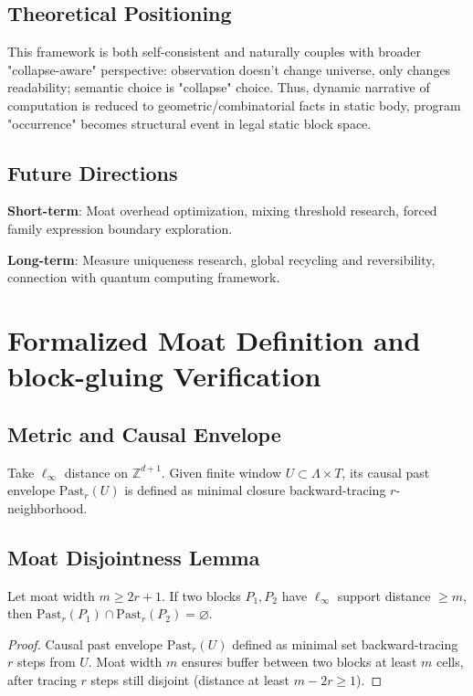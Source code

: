 \documentclass[12pt]{article}
\theoremstyle{plain}
\theoremstyle{definition}
\begin{document}
\subsection{Theoretical Positioning}

This framework is both self-consistent and naturally couples with broader "collapse-aware" perspective: observation doesn't change universe, only changes readability; semantic choice is "collapse" choice. Thus, dynamic narrative of computation is reduced to geometric/combinatorial facts in static body, program "occurrence" becomes structural event in legal static block space.

\subsection{Future Directions}

\textbf{Short-term}: Moat overhead optimization, mixing threshold research, forced family expression boundary exploration.

\textbf{Long-term}: Measure uniqueness research, global recycling and reversibility, connection with quantum computing framework.

\appendix

\section{Formalized Moat Definition and block-gluing Verification}

\subsection{Metric and Causal Envelope}

Take $\ell_\infty$ distance on $\mathbb{Z}^{d+1}$. Given finite window $U \subset \Lambda \times T$, its causal past envelope $\mathrm{Past}_r(U)$ is defined as minimal closure backward-tracing $r$-neighborhood.

\subsection{Moat Disjointness Lemma}

Let moat width $m \ge 2r + 1$. If two blocks $P_1, P_2$ have $\ell_\infty$ support distance $\ge m$, then $\mathrm{Past}_r(P_1) \cap \mathrm{Past}_r(P_2) = \varnothing$.

\begin{proof}
Causal past envelope $\mathrm{Past}_r(U)$ defined as minimal set backward-tracing $r$ steps from $U$. Moat width $m$ ensures buffer between two blocks at least $m$ cells, after tracing $r$ steps still disjoint (distance at least $m - 2r \ge 1$).
\end{proof}
\end{document}

